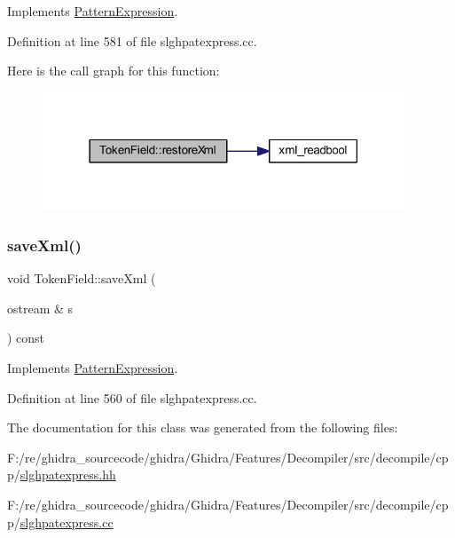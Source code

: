 Implements \mbox{\hyperlink{class_pattern_expression_ad8986afdddbe7a8b64fdcf10478b5715}{Pattern\+Expression}}.



Definition at line 581 of file slghpatexpress.\+cc.

Here is the call graph for this function\+:
\nopagebreak
\begin{figure}[H]
\begin{center}
\leavevmode
\includegraphics[width=306pt]{class_token_field_a6c2c56a97eeb763ee32c4d66770e1c2f_cgraph}
\end{center}
\end{figure}
\mbox{\label{class_token_field_a891f7bfcc1e47b28cb40fc6bd9dbfdbe}} 
\subsubsection{\texorpdfstring{saveXml()}{saveXml()}}
{\footnotesize\ttfamily void Token\+Field\+::save\+Xml (\begin{DoxyParamCaption}\item[{ostream \&}]{s }\end{DoxyParamCaption}) const\hspace{0.3cm}{\ttfamily [virtual]}}



Implements \mbox{\hyperlink{class_pattern_expression_a0d9c89ffbf4a22fac68189a845cde92a}{Pattern\+Expression}}.



Definition at line 560 of file slghpatexpress.\+cc.



The documentation for this class was generated from the following files\+:\begin{DoxyCompactItemize}
\item 
F\+:/re/ghidra\+\_\+sourcecode/ghidra/\+Ghidra/\+Features/\+Decompiler/src/decompile/cpp/\mbox{\hyperlink{slghpatexpress_8hh}{slghpatexpress.\+hh}}\item 
F\+:/re/ghidra\+\_\+sourcecode/ghidra/\+Ghidra/\+Features/\+Decompiler/src/decompile/cpp/\mbox{\hyperlink{slghpatexpress_8cc}{slghpatexpress.\+cc}}\end{DoxyCompactItemize}
